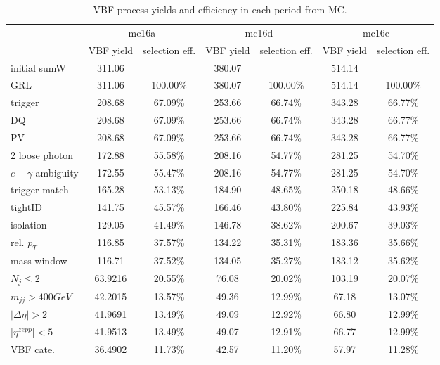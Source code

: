 \begin{table}[htbp]
\begin{center}
\begin{tabular}{l|cccccc}
\hline
                     & \multicolumn{2}{c}{mc16a}  & \multicolumn{2}{c}{mc16d}  & \multicolumn{2}{c}{mc16e}  \\
                     & VBF yield & selection eff. & VBF yield & selection eff. & VBF yield & selection eff. \\ \hline
initial sumW         & 311.06    &                & 380.07    &                & 514.14    &                \\
GRL                  & 311.06    & 100.00\%       & 380.07    & 100.00\%       & 514.14    & 100.00\%       \\
trigger              & 208.68    & 67.09\%        & 253.66    & 66.74\%        & 343.28    & 66.77\%        \\
DQ                   & 208.68    & 67.09\%        & 253.66    & 66.74\%        & 343.28    & 66.77\%        \\
PV                   & 208.68    & 67.09\%        & 253.66    & 66.74\%        & 343.28    & 66.77\%        \\
2 loose photon       & 172.88    & 55.58\%        & 208.16    & 54.77\%        & 281.25    & 54.70\%        \\
$e-\gamma$ ambiguity & 172.55    & 55.47\%        & 208.16    & 54.77\%        & 281.25    & 54.70\%        \\
trigger match        & 165.28    & 53.13\%        & 184.90    & 48.65\%        & 250.18    & 48.66\%        \\
tightID              & 141.75    & 45.57\%        & 166.46    & 43.80\%        & 225.84    & 43.93\%        \\
isolation            & 129.05    & 41.49\%        & 146.78    & 38.62\%        & 200.67    & 39.03\%        \\
rel. $p_{T}$         & 116.85    & 37.57\%        & 134.22    & 35.31\%        & 183.36    & 35.66\%        \\
mass window          & 116.71    & 37.52\%        & 134.05    & 35.27\%        & 183.12    & 35.62\%        \\
$N_{j}\le2$          & 63.9216   & 20.55\%        & 76.08     & 20.02\%        & 103.19    & 20.07\%        \\
$m_{jj}>400GeV$      & 42.2015   & 13.57\%        & 49.36     & 12.99\%        & 67.18     & 13.07\%        \\
$|\Delta\eta|>2$     & 41.9691   & 13.49\%        & 49.09     & 12.92\%        & 66.80     & 12.99\%        \\
$|\eta^{zepp}|<5$    & 41.9513   & 13.49\%        & 49.07     & 12.91\%        & 66.77     & 12.99\%        \\
VBF cate.            & 36.4902   & 11.73\%        & 42.57     & 11.20\%        & 57.97     & 11.28\%       	\\
\hline
\end{tabular}
\caption{VBF process yields and efficiency in each period from MC.}
\label{tab:cutflowVBF}
\end{center}
\end{table}

